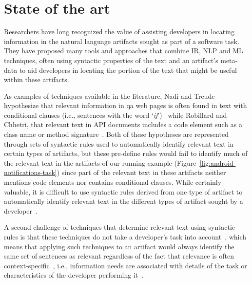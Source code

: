 \section{State of the art}
\label{cp1:novelty}


Researchers have long recognized the value of 
assisting developers in locating information in the natural language artifacts sought as part of a software task.
They have proposed many tools and approaches 
that combine \acf{IR}, \acf{NLP} and \acf{ML} techniques,
often using  syntactic properties of the text and an artifact's meta-data
to aid developers in locating the portion of the text that
might be useful within these artifacts.






As examples of techniques available in the literature, Nadi and Treude hypothesize 
that relevant information in \acs{qa} 
web pages is often found in text with
conditional clauses (i.e., sentences with the word `\textit{if}')~\cite{nadi2020}
while Robillard and Chhetri, that relevant 
text in API documents includes a code element such as a class name or method signature~\cite{Robillard2015}.
Both of these hypotheses are 
represented through 
sets of syntactic rules 
used to automatically
identify relevant text in certain types of artifacts,
but these pre-define rules would fail to identify much of the relevant text in the artifacts of our running example
(Figure~\ref{fig:android-notifications-task})
since part of the relevant text in these artifacts 
neither mentions code elements 
nor contains conditional clauses.
While certainly valuable, 
it is difficult to use 
syntactic rules 
derived from one type of artifact
to automatically identify relevant text 
in the different types of artifact
sought by a developer~\cite{Bavota2016}.


% 


A second challenge of techniques that 
determine relevant text using syntactic rules is that 
these techniques do not take  a developer's task into account~\cite{Robillard2015}, which means that applying such 
techniques to an artifact would always identify 
the same set of sentences as relevant 
regardless of the fact that relevance is often context-specific~\cite{Bavota2016}, i.e., information needs are associated with details of the task 
or characteristics of the developer performing it~\cite{Robillard2015}.


